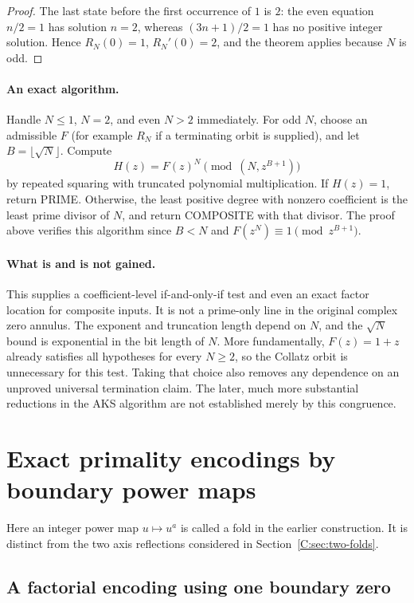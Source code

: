 \documentclass[11pt,a4paper]{article}
\theoremstyle{definition}
\theoremstyle{remark}
\numberwithin{equation}{section}
\begin{document}
\begin{proof}
The last state before the first occurrence of $1$ is $2$: the even equation
$n/2=1$ has solution $n=2$, whereas $(3n+1)/2=1$ has no positive integer
solution.  Hence $R_N(0)=1$, $R_N'(0)=2$, and the theorem applies because
$N$ is odd.
\end{proof}

\paragraph{An exact algorithm.}
Handle $N\leq1$, $N=2$, and even $N>2$ immediately.  For odd $N$, choose
an admissible $F$ (for example $R_N$ if a terminating orbit is supplied),
and let $B=\lfloor\sqrt N\rfloor$.  Compute
\[
 H(z)=F(z)^N\pmod{(N,z^{B+1})}
\]
by repeated squaring with truncated polynomial multiplication.  If
$H(z)=1$, return PRIME.  Otherwise, the least positive degree with nonzero
coefficient is the least prime divisor of $N$, and return COMPOSITE with
that divisor.  The proof above verifies this algorithm since $B<N$ and
$F(z^N)\equiv1\pmod {z^{B+1}}$.

\paragraph{What is and is not gained.}
This supplies a coefficient-level if-and-only-if test and even an exact
factor location for composite inputs.  It is not a prime-only line in the
original complex zero annulus.  The exponent and truncation length depend
on $N$, and the $\sqrt N$ bound is exponential in the bit length of $N$.
More fundamentally, $F(z)=1+z$ already satisfies all hypotheses for every
$N\geq2$, so the Collatz orbit is unnecessary for this test.  Taking that
choice also removes any dependence on an unproved universal termination
claim.  The later, much more substantial reductions in the AKS algorithm
are not established merely by this congruence.



\section{Exact primality encodings by boundary power maps}
\label{C:sec:boundary-prime-encodings}
Here an integer power map $u\mapsto u^a$ is called a fold in the earlier
construction. It is distinct from the two axis reflections considered
in Section~\ref{C:sec:two-folds}.
\subsection{A factorial encoding using one boundary zero}
\label{C:sec:factorial-folding}
\end{document}

